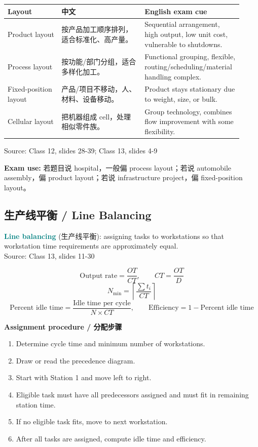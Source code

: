 \documentclass[10pt,a4paper]{ctexart}
\newcommand{\term}[2]{\textbf{\textcolor{Teal}{#1}} \textcolor{Muted}{(#2)}}
\newcommand{\source}[1]{\textcolor{Muted}{\footnotesize Source: #1}}
\newcommand{\exam}[1]{\textcolor{Amber}{\textbf{Exam use:} #1}}
\begin{document}
\begin{longtable}{@{}L{0.22\linewidth}L{0.34\linewidth}L{0.36\linewidth}@{}}
\toprule
\textbf{Layout} & \textbf{中文} & \textbf{English exam cue} \\
\midrule
Product layout & 按产品加工顺序排列，适合标准化、高产量。 & Sequential arrangement, high output, low unit cost, vulnerable to shutdowns. \\
Process layout & 按功能/部门分组，适合多样化加工。 & Functional grouping, flexible, routing/scheduling/material handling complex. \\
Fixed-position layout & 产品/项目不移动，人、材料、设备移动。 & Product stays stationary due to weight, size, or bulk. \\
Cellular layout & 把机器组成 cell，处理相似零件族。 & Group technology, combines flow improvement with some flexibility. \\
\bottomrule
\end{longtable}
\source{Class 12, slides 28-39; Class 13, slides 4-9}

\exam{若题目说 hospital，一般偏 process layout；若说 automobile assembly，偏 product layout；若说 infrastructure project，偏 fixed-position layout。}

\subsection{生产线平衡 / Line Balancing}
\label{subsec:line-balancing}

\term{Line balancing}{生产线平衡}: assigning tasks to workstations so that workstation time requirements are approximately equal.\\
\source{Class 13, slides 11-30}

\[
\text{Output rate}=\frac{OT}{CT}, \qquad CT=\frac{OT}{D}
\]
\[
N_{\min}=\left\lceil\frac{\sum t_i}{CT}\right\rceil
\]
\[
\text{Percent idle time}=\frac{\text{Idle time per cycle}}{N\times CT}, \qquad
\text{Efficiency}=1-\text{Percent idle time}
\]

\textbf{Assignment procedure / 分配步骤}
\begin{enumerate}
  \item Determine cycle time and minimum number of workstations.
  \item Draw or read the precedence diagram.
  \item Start with Station 1 and move left to right.
  \item Eligible task must have all predecessors assigned and must fit in remaining station time.
  \item If no eligible task fits, move to next workstation.
  \item After all tasks are assigned, compute idle time and efficiency.
\end{enumerate}
\end{document}
